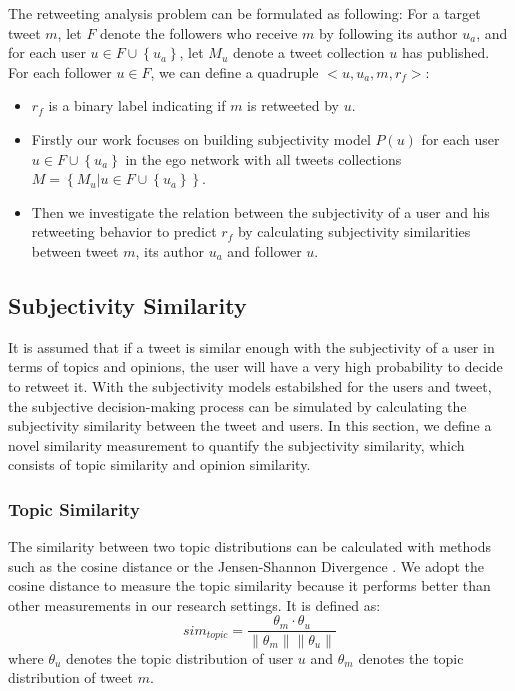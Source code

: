 \documentclass{acm_proc_article-sp}
\begin{document}
The retweeting analysis problem can be formulated as following:
For a target tweet $ m $, let $ F $ denote the followers who receive $ m $ by following its author $ u_{a} $, and for each user $ u \in F \cup \left\lbrace u_{a} \right\rbrace  $, let $ M_{u} $ denote a tweet collection $ u $ has published. 
For each follower $ u \in F $, we can define a quadruple $ <u, u_{a}, m, r_{f}>  $: 
\begin{itemize}
\item $ r_{f} $ is a binary label indicating if $ m $ is retweeted by $ u $.
\item Firstly our work focuses on building subjectivity model $ P\left( u \right)  $ for each user $ u \in F \cup \left\lbrace u_{a} \right\rbrace $ in the ego network with all tweets collections $ M=\left\lbrace M_{u} | u \in F \cup \left\lbrace u_{a} \right\rbrace  \right\rbrace  $.
\item Then we investigate the relation between the subjectivity of a user and his retweeting behavior to predict $ r_{f} $ by calculating subjectivity similarities between tweet $ m $, its author $ u_{a} $ and follower $ u $. 
\end{itemize}

\subsection{Subjectivity Similarity}
\label{similarity}

It is assumed that if a tweet is similar enough with the subjectivity of a user in terms of topics and opinions, the user will have a very high probability to decide to retweet it. 
With the subjectivity models estabilshed for the users and tweet, the subjective decision-making process can be simulated by calculating the subjectivity similarity between the tweet and users. 
In this section, we define a novel similarity measurement to quantify the subjectivity similarity, which consists of topic similarity and opinion similarity. 
 
\subsubsection{Topic Similarity}
\label{topsim}

The similarity between two topic distributions can be calculated with methods such as the cosine distance \cite{cha2007comprehensive} or the Jensen-Shannon Divergence \cite{weng2010twitterrank}.
We adopt the cosine distance to measure the topic similarity because it performs better than other measurements in our research settings. It is defined as:
\begin{equation}
sim_{topic}=\dfrac{\theta_{m} \cdot \theta_{u}}{\parallel \theta_{m} \parallel \parallel \theta_{u} \parallel}
\end{equation}
where $ \theta_{u}$ denotes the topic distribution of user $ u $ and $\theta_{m}$ denotes the topic distribution of tweet $ m $. 
\end{document}
